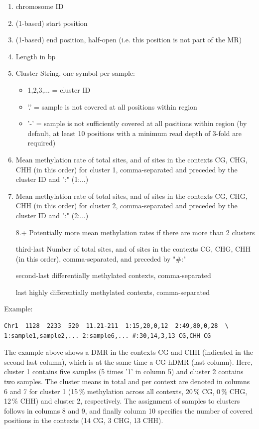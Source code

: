 \documentclass{article}
\begin{document}
\begin{enumerate}
	\item chromosome ID
	\item (1-based) start position
	\item (1-based) end position, half-open (i.e. this position is not part of the MR)
	\item Length in bp
	\item Cluster String, one symbol per sample:
			\begin{itemize}
				\item 1,2,3,... = cluster ID
				\item '.' = sample is not covered at all positions within region
				\item '-' = sample is not sufficiently covered at all positions within region (by default, at least 10 positions with a minimum read depth of 3-fold are required)
			\end{itemize}
	\item Mean methylation rate of total sites, and of sites in the contexts CG, CHG, CHH (in this order) for cluster 1, comma-separated and preceded by the cluster ID and ":" (1:...)
	\item Mean methylation rate of total sites, and of sites in the contexts CG, CHG, CHH (in this order) for cluster 2, comma-separated and preceded by the cluster ID and ":" (2:...)
	\item[8.+] Potentially more mean methylation rates if there are more than 2 clusters
	\item[third-last] Number of total sites, and of sites in the contexts CG, CHG, CHH (in this order), comma-separated, and preceded by "\#:"
	\item[second-last] differentially methylated contexts, comma-separated
	\item[last] highly differentially methylated contexts, comma-separated
\end{enumerate}

\noindent Example:
\begin{lstlisting}
Chr1  1128  2233  520  11.21-211  1:15,20,0,12  2:49,80,0,28  \
1:sample1,sample2,... 2:sample6,... #:30,14,3,13 CG,CHH CG
\end{lstlisting}

\noindent The example above shows a DMR in the contexts CG and CHH (indicated in the second last column), which is at the same time a CG-hDMR (last column). Here, cluster 1 contains five samples (5 times '1' in column 5) and cluster 2 contains two samples. The cluster means in total and per context are denoted in columns 6 and 7 for cluster 1 (15\,\% methylation across all contexts, 20\,\% CG, 0\,\% CHG, 12\,\% CHH) and cluster 2, respectively. The assignment of samples to clusters follows in columns 8 and 9, and finally column 10 specifies the number of covered positions in the contexts (14 CG, 3 CHG, 13 CHH).
\end{document}
